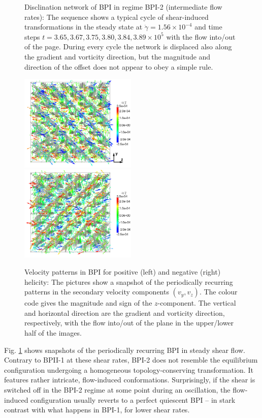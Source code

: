 \documentclass[8.5pt,twoside,twocolumn]{article}
\newcommand{\e}[1]{\times10^{#1}}
\newcommand{\gd}{\dot{\gamma}}
\begin{document}
\begin{figure}[htpb]
\caption{Disclination network of BPI in regime BPI-2 (intermediate flow rates): 
The sequence shows a typical cycle of shear-induced transformations in the 
steady state at $\gd=1.56\e{-4}$ and time steps 
$t=3.65, 3.67,3.75,3.80,3.84,3.89\e{5}$ with the flow into/out of the page. 
During every cycle the network is displaced also along the gradient and vorticity direction, 
but the magnitude and direction of the offset does not appear to obey a 
simple rule.}
\label{bp1-med}
\end{figure}

\begin{figure}[htpb]
\includegraphics[width=0.495\textwidth]{v_yz-v_z-360k_run914.png}
\includegraphics[width=0.495\textwidth]{v_yz-v_z-360k_run922.png}
\caption{Velocity patterns in BPI for positive (left) and negative (right) helicity: 
The pictures show a snapshot of the periodically recurring patterns in the 
secondary velocity components $(v_y,v_z)$. 
The colour code gives the magnitude and sign 
of the $z$-component. The vertical and horizontal direction are the gradient and 
vorticity direction, respectively, with the flow into/out of the plane in the 
upper/lower half of the images.}
\label{bp1-velo}
\end{figure}

Fig. \ref{bp1-med} shows snapshots of the periodically recurring 
BPI in steady shear flow. Contrary to BPII-1 at these shear rates, 
BPI-2 does not resemble the equilibrium configuration
undergoing a homogeneous topology-conserving 
transformation. It features rather intricate, flow-induced 
conformations. Surprisingly, if the shear is switched off in
the BPI-2 regime at some point during an oscillation, 
the flow-induced configuration usually
reverts to a perfect quiescent BPI -- in stark contrast with
what happens in BPI-1, for lower shear rates. 
\end{document}
